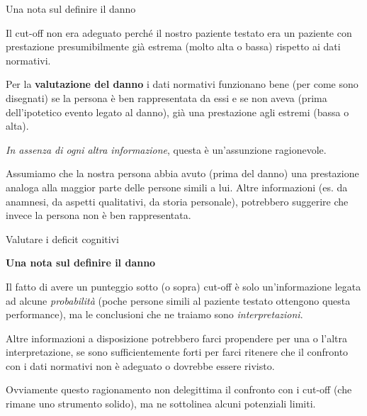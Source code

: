 \documentclass[
  ignorenonframetext,
  aspectratio=169,
]{beamer}
\begin{document}
\begin{frame}{Una nota sul definire il danno}
\label{una-nota-sul-definire-il-danno}
\small

Il cut-off non era adeguato perché il nostro paziente testato era un
paziente con prestazione presumibilmente già estrema (molto alta o
bassa) rispetto ai dati normativi.

Per la \textbf{valutazione del danno} i dati normativi funzionano bene
(per come sono disegnati) se la persona è ben rappresentata da essi e se
non aveva (prima dell'ipotetico evento legato al danno), già una
prestazione agli estremi (bassa o alta).

\emph{In assenza di ogni altra informazione}, questa è un'assunzione
ragionevole.

Assumiamo che la nostra persona abbia avuto (prima del danno) una
prestazione analoga alla maggior parte delle persone simili a lui. Altre
informazioni (es. da anamnesi, da aspetti qualitativi, da storia
personale), potrebbero suggerire che invece la persona non è ben
rappresentata.
\end{frame}

\begin{frame}{Valutare i deficit cognitivi}
\label{valutare-i-deficit-cognitivi-7}
\begin{center}
  \textbf{Una nota sul definire il danno}
\end{center}

Il fatto di avere un punteggio sotto (o sopra) cut-off è solo
un'informazione legata ad alcune \emph{probabilità} (poche persone
simili al paziente testato ottengono questa performance), ma le
conclusioni che ne traiamo sono \emph{interpretazioni}.

Altre informazioni a disposizione potrebbero farci propendere per una o
l'altra interpretazione, se sono sufficientemente forti per farci
ritenere che il confronto con i dati normativi non è adeguato o dovrebbe
essere rivisto.

Ovviamente questo ragionamento non delegittima il confronto con i
cut-off (che rimane uno strumento solido), ma ne sottolinea alcuni
potenziali limiti.
\end{frame}
\end{document}
